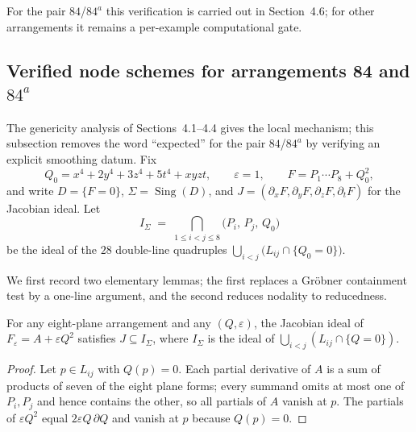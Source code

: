 For the pair $84$/$84^{a}$ this verification is carried out in
Section~4.6; for other arrangements it remains a per-example computational
gate.

\subsection{Verified node schemes for arrangements 84 and $84^{a}$}
\label{sec:verified-nodes}

The genericity analysis of Sections~4.1--4.4 gives the local mechanism; this
subsection removes the word ``expected'' for the pair $84$/$84^{a}$ by
verifying an explicit smoothing datum. Fix
\[
  Q_0 = x^4 + 2y^4 + 3z^4 + 5t^4 + xyzt,
  \qquad \varepsilon = 1,
  \qquad F = P_1 \cdots P_8 + Q_0^2 ,
\]
and write $D = \{F = 0\}$, $\Sigma = \operatorname{Sing}(D)$, and
$J = (\partial_x F, \partial_y F, \partial_z F, \partial_t F)$ for the
Jacobian ideal. Let
\[
  I_\Sigma \;=\; \bigcap_{1 \le i < j \le 8}
     \bigl( P_i,\, P_j,\, Q_0 \bigr)
\]
be the ideal of the $28$ double-line quadruples
$\bigcup_{i<j} \bigl( L_{ij} \cap \{Q_0 = 0\} \bigr)$.

We first record two elementary lemmas; the first replaces a Gr\"obner
containment test by a one-line argument, and the second reduces nodality to
reducedness.

\begin{lemma}\label{lem:containment}
For any eight-plane arrangement and any $(Q, \varepsilon)$, the Jacobian
ideal of $F_\varepsilon = A + \varepsilon Q^2$ satisfies
$J \subseteq I_\Sigma$, where $I_\Sigma$ is the ideal of
$\bigcup_{i<j} (L_{ij} \cap \{Q = 0\})$.
\end{lemma}

\begin{proof}
Let $p \in L_{ij}$ with $Q(p) = 0$. Each partial derivative of $A$ is a sum
of products of seven of the eight plane forms; every summand omits at most
one of $P_i, P_j$ and hence contains the other, so all partials of $A$
vanish at $p$. The partials of $\varepsilon Q^2$ equal
$2\varepsilon Q \,\partial Q$ and vanish at $p$ because $Q(p) = 0$.
\end{proof}

